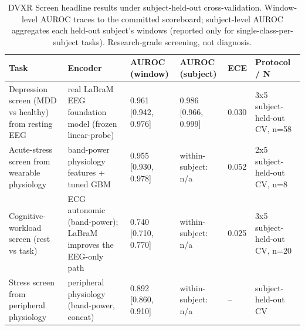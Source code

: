 \begin{table}[t]
\centering
\caption{DVXR Screen headline results under subject-held-out cross-validation. Window-level AUROC traces to the committed scoreboard; subject-level AUROC aggregates each held-out subject's windows (reported only for single-class-per-subject tasks). Research-grade screening, not diagnosis.}
\label{tab:headline}
\begin{tabular}{llllll}
\toprule
Task & Encoder & AUROC (window) & AUROC (subject) & ECE & Protocol / N \\
\midrule
Depression screen (MDD vs healthy) from resting EEG & real LaBraM EEG foundation model (frozen linear-probe) & 0.961 [0.942, 0.976] & 0.986 [0.966, 0.999] & 0.030 & 3x5 subject-held-out CV, n=58 \\
Acute-stress screen from wearable physiology & band-power physiology features + tuned GBM & 0.955 [0.930, 0.978] & within-subject: n/a & 0.052 & 2x5 subject-held-out CV, n=8 \\
Cognitive-workload screen (rest vs task) & ECG autonomic (band-power); LaBraM improves the EEG-only path & 0.740 [0.710, 0.770] & within-subject: n/a & 0.025 & 3x5 subject-held-out CV, n=20 \\
Stress screen from peripheral physiology & peripheral physiology (band-power, concat) & 0.892 [0.860, 0.910] & within-subject: n/a & -- & subject-held-out CV \\
\bottomrule
\end{tabular}
\end{table}
